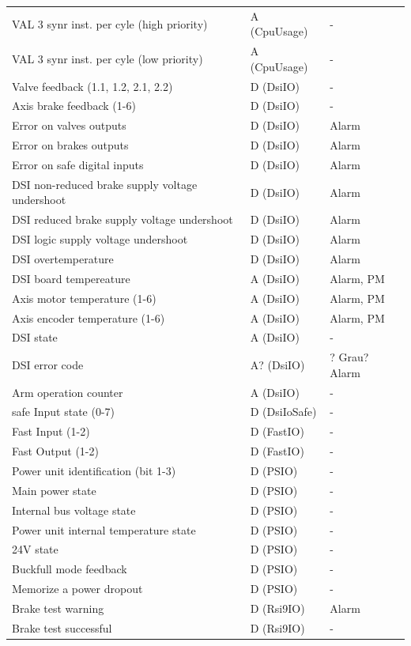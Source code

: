 \documentclass[ a4paper,
                oneside,
                toc=bibliography,
                toc=listof
                ]{scrbook}
\begin{document}
\begin{longtable}{|p{7cm}|p{3cm}|p{3cm}|}
		VAL 3 synr inst. per cyle (high priority) & A (CpuUsage) & - \\
		VAL 3 synr inst. per cyle (low priority) & A (CpuUsage) & - \\
		\hline
		Valve feedback (1.1, 1.2, 2.1, 2.2) & D (DsiIO) & - \\
		Axis brake feedback (1-6) & D (DsiIO) & - \\
		Error on valves outputs & D (DsiIO) & Alarm \\
		Error on brakes outputs & D (DsiIO) & Alarm \\
		Error on safe digital inputs & D (DsiIO) & Alarm \\
		DSI non-reduced brake supply voltage undershoot & D (DsiIO) & Alarm \\
		DSI reduced brake supply voltage undershoot & D (DsiIO) & Alarm \\
		DSI logic supply voltage undershoot & D (DsiIO) & Alarm \\
		DSI overtemperature & D (DsiIO) & Alarm \\
		\hline
		DSI board tempereature & A (DsiIO) & Alarm, PM \\
		Axis motor temperature (1-6) & A (DsiIO) & Alarm, PM \\
		Axis encoder temperature (1-6) & A (DsiIO) & Alarm, PM \\
		DSI state & A (DsiIO) & - \\
		DSI error code & A? (DsiIO) & ? Grau? Alarm \\
		Arm operation counter & A (DsiIO) & - \\
		\hline
		safe Input state (0-7) & D (DsiIoSafe) & - \\
		\hline
		Fast Input (1-2) & D (FastIO) & - \\
		Fast Output (1-2) & D (FastIO) & - \\
		\hline
		Power unit identification (bit 1-3) & D (PSIO) & - \\
		Main power state & D (PSIO) & - \\
		Internal bus voltage state & D (PSIO) & - \\
		Power unit internal temperature state & D (PSIO) & - \\
		24V state & D (PSIO) & - \\
		Buckfull mode feedback & D (PSIO) & - \\
		Memorize a power dropout & D (PSIO) & - \\
		\hline
		Brake test warning & D (Rsi9IO) & Alarm \\
		Brake test successful & D (Rsi9IO) & - \\

\end{longtable}
\end{document}

